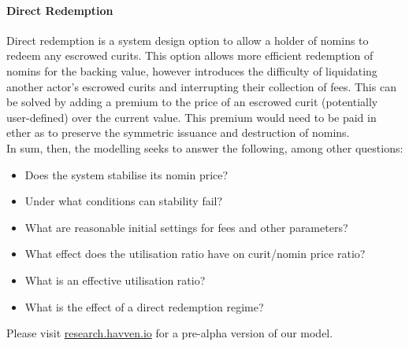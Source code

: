 \paragraph{Direct Redemption} Direct redemption is a system design option to allow a holder of nomins to redeem any escrowed curits. This option allows more efficient redemption of nomins for the backing value, however introduces the difficulty of liquidating another actor's escrowed curits and interrupting their collection of fees. This can be solved by adding a premium to the price of an escrowed curit (potentially user-defined) over the current value. This premium would need to be paid in ether as to preserve the symmetric issuance and destruction of nomins. \\

\noindent In sum, then, the modelling seeks to answer the following, among other questions:

\begin{itemize}
    \item Does the system stabilise its nomin price?
    \item Under what conditions can stability fail?
    \item What are reasonable initial settings for fees and other parameters?
    \item What effect does the utilisation ratio have on curit/nomin price ratio?
    \item What is an effective utilisation ratio?
    \item What is the effect of a direct redemption regime?
\end{itemize}





\noindent Please visit \href{http://research.havven.io}{research.havven.io} for a pre-alpha version of our model.

\pagebreak
